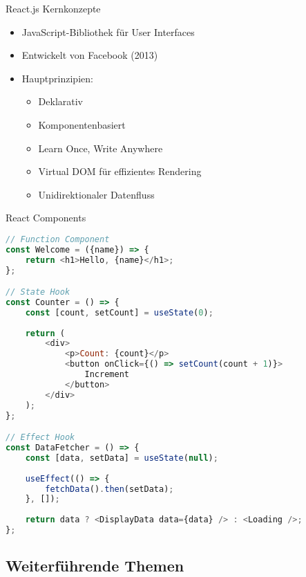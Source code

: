\begin{concept}{React.js Kernkonzepte}
    \begin{itemize}
        \item JavaScript-Bibliothek für User Interfaces
        \item Entwickelt von Facebook (2013)
        \item Hauptprinzipien:
            \begin{itemize}
                \item Deklarativ
                \item Komponentenbasiert
                \item Learn Once, Write Anywhere
                \item Virtual DOM für effizientes Rendering
                \item Unidirektionaler Datenfluss
            \end{itemize}
    \end{itemize}
\end{concept}

\begin{KR}{React Components}
\begin{lstlisting}[language=JavaScript, style=basesmol]
// Function Component
const Welcome = ({name}) => {
    return <h1>Hello, {name}</h1>;
};

// State Hook
const Counter = () => {
    const [count, setCount] = useState(0);
    
    return (
        <div>
            <p>Count: {count}</p>
            <button onClick={() => setCount(count + 1)}>
                Increment
            </button>
        </div>
    );
};

// Effect Hook
const DataFetcher = () => {
    const [data, setData] = useState(null);
    
    useEffect(() => {
        fetchData().then(setData);
    }, []);
    
    return data ? <DisplayData data={data} /> : <Loading />;
};
\end{lstlisting}
\end{KR}

\subsection{Weiterführende Themen}

